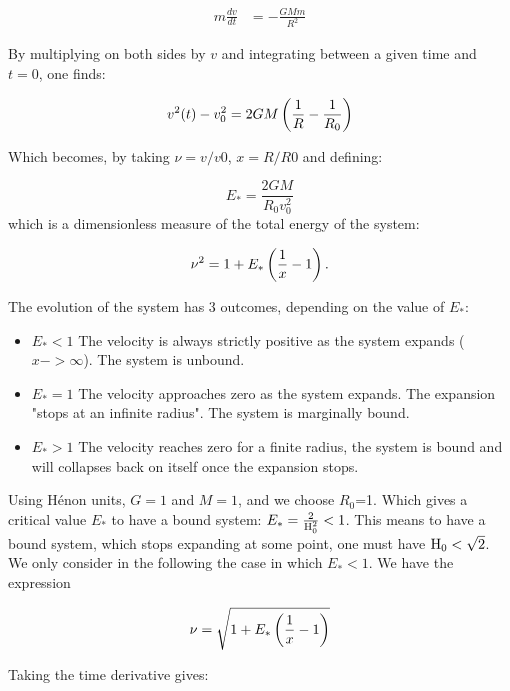 \begin{align}\label{eq:newton}
m \frac{dv}{dt} & = - \frac{G M m}{R^2}
\end{align}

By multiplying on both sides by $v$ and integrating between a given time and $t=0$, one finds:

\begin{equation}
v^2(t) - v^2_0 = 2GM \left( \frac{1}{R} - \frac{1}{R_0} \right)
\end{equation}

Which becomes, by taking $\nu = v/v0$,  $x= R/R0$ and defining:

\begin{equation}
\label{Eq:1_Estar}
E_\ast = \frac{2GM}{R_0 v_0^2}
\end{equation}
which is a dimensionless measure of the total energy of the system:

\begin{equation}
\nu^2  = 1 + E_\ast \left( \frac{1}{x} - 1 \right) .
\end{equation}

The evolution of the system has 3 outcomes, depending on the value of $E_\ast$:
\begin{itemize}
\item $E_\ast<1$ The velocity is always strictly positive as the system expands ($x->\infty$). The system is unbound.
\item $E_\ast=1$ The velocity approaches zero as the system expands. The expansion "stops at an infinite radius". The system is marginally bound.
\item $E_\ast>1$ The velocity reaches zero for a finite radius, the system is bound and will collapses back on itself once the expansion stops. 
\end{itemize}

Using H\'enon units, $G=1$ and $M=1$, and we choose $R_0$=1. Which gives a critical value $E_*$ to have a bound system: $E_* = \frac{2}{{\textrm{H}}^2_0} < 1$. This means to have a bound system, which stops expanding at some point, one must have ${\textrm{H}}_0 < \sqrt{2}$.
We only consider in the following the case in which $E_\ast<1$. We have the expression

\begin{equation}
\nu = \sqrt{1+E_\ast\left(\frac{1}{x} - 1\right)}
\end{equation}

Taking the time derivative gives:

